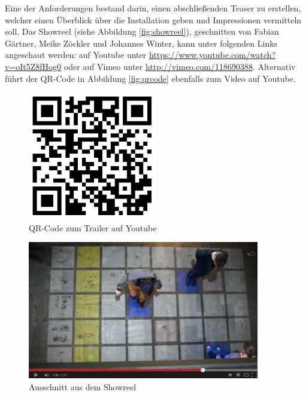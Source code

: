 
Eine der Anforderungen bestand darin, einen abschließenden Teaser zu erstellen, welcher einen Überblick über die Installation geben und Impressionen vermitteln soll. Das Showreel (siehe Abbildung \autoref{fig:showreel}), geschnitten von Fabian Gärtner, Meike Zöckler und Johannes Winter, kann unter folgenden Links angeschaut werden: auf Youtube unter \url{https://www.youtube.com/watch?v=oIt5Z8fHog0} oder auf Vimeo unter \url{http://vimeo.com/118690388}. Alternativ führt der QR-Code in Abbildung \autoref{fig:qrcode} ebenfalls zum Video auf Youtube.

\begin{figure}[htbp]
	\centering
		\includegraphics[width=0.5\textwidth]{images/qrcode.png}
	\caption{QR-Code zum Trailer auf Youtube}
	\label{fig:qrcode}
\end{figure}

\begin{figure}[htbp]
	\centering
		\includegraphics[width=0.9\textwidth]{images/showreel.png}
	\caption{Ausschnitt aus dem Showreel}
	\label{fig:showreel}
\end{figure}

